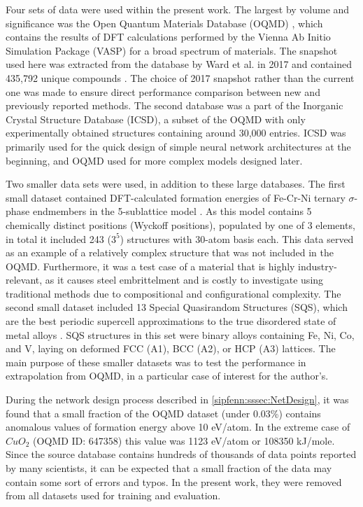 Four sets of data were used within the present work. The largest by volume and significance was the Open Quantum Materials Database (OQMD) \cite{Kirklin2015TheEnergies, Saal2013MaterialsOQMD, Shen2022ReflectionsOQMD}, which contains the results of DFT calculations performed by the Vienna Ab Initio Simulation Package (VASP) \cite{Kresse1993AbMetals} for a broad spectrum of materials. The snapshot used here was extracted from the database by Ward et al. in 2017 and contained 435,792 unique compounds \cite{Ward2017IncludingTessellations}. The choice of 2017 snapshot rather than the current one was made to ensure direct performance comparison between new and previously reported methods. The second database was a part of the Inorganic Crystal Structure Database (ICSD), a subset of the OQMD with only experimentally obtained structures containing around 30,000 entries. ICSD was primarily used for the quick design of simple neural network architectures at the beginning, and OQMD used for more complex models designed later. 

Two smaller data sets were used, in addition to these large databases. The first small dataset contained DFT-calculated formation energies of Fe-Cr-Ni ternary $\sigma$-phase endmembers in the 5-sublattice model \cite{Feurer2019Cr-Fe-NiCalculations}. As this model contains 5 chemically distinct positions (Wyckoff positions), populated by one of 3 elements, in total it included 243 ($3^5$) structures with 30-atom basis each. This data served as an example of a relatively complex structure that was not included in the OQMD. Furthermore, it was a test case of a material that is highly industry-relevant, as it causes steel embrittelment \cite{Hsieh2012OverviewSteels} and is costly to investigate using traditional methods due to compositional and configurational complexity. The second small dataset included 13 Special Quasirandom Structures (SQS), which are the best periodic supercell approximations to the true disordered state of metal alloys \cite{Zunger1990SpecialStructures, Jiang2004First-principlesStructures, Shin2006ThermodynamicStructures}. SQS structures in this set were binary alloys containing Fe, Ni, Co, and V, laying on deformed FCC (A1), BCC (A2), or HCP (A3) lattices. The main purpose of these smaller datasets was to test the performance in extrapolation from OQMD, in a particular case of interest for the author's.

During the network design process described in \ref{sipfenn:sssec:NetDesign}, it was found that a small fraction of the OQMD dataset (under 0.03\%) contains anomalous values of formation energy above 10 eV/atom. In the extreme case of $CuO_2$ (OQMD ID: 647358) this value was 1123 eV/atom or 108350 kJ/mole. Since the source database contains hundreds of thousands of data points reported by many scientists, it can be expected that a small fraction of the data may contain some sort of errors and typos. In the present work, they were removed from all datasets used for training and evaluation.

